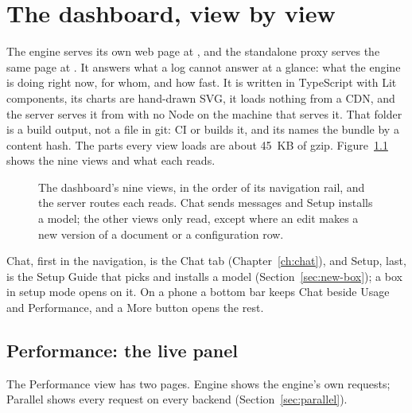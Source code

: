 \chapter{The dashboard, view by view}\label{ch:dashboard}

The engine serves its own web page at , and the standalone proxy serves the same page at . It answers what a log cannot answer at a glance: what the engine is doing right now, for whom, and how fast. It is written in TypeScript with Lit components, its charts are hand-drawn SVG, it loads nothing from a CDN, and the server serves it from  with no Node on the machine that serves it. That folder is a build output, not a file in git: CI or  builds it, and its  names the bundle by a content hash. The parts every view loads are about 45~KB of gzip. Figure~\ref{fig:dashboard-map} shows the nine views and what each reads.

\begin{figure}[htbp]
\centering

\caption[The dashboard's views]{The dashboard's nine views, in the order of its navigation rail, and the server routes each reads. Chat sends messages and Setup installs a model; the other views only read, except where an edit makes a new version of a document or a configuration row.}\label{fig:dashboard-map}
\end{figure}

Chat, first in the navigation, is the Chat tab (Chapter~\ref{ch:chat}), and Setup, last, is the Setup Guide that picks and installs a model (Section~\ref{sec:new-box}); a box in setup mode opens on it. On a phone a bottom bar keeps Chat beside Usage and Performance, and a More button opens the rest.

\section{Performance: the live panel}

The Performance view has two pages. Engine shows the engine's own requests; Parallel shows every request on every backend (Section~\ref{sec:parallel}).


